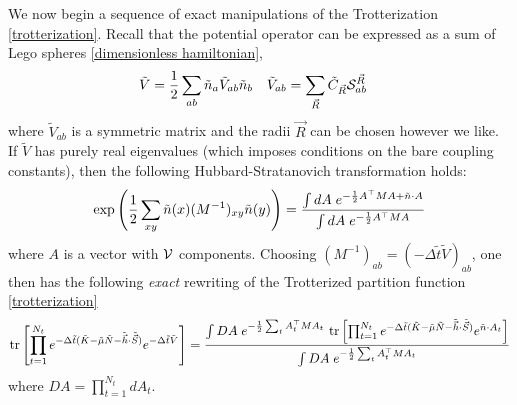 We now begin a sequence of exact manipulations of the Trotterization \eqref{trotterization}.
Recall that the potential operator can be expressed as a sum of Lego spheres \eqref{dimensionless hamiltonian},
\begin{align}
	\tilde{V}
	&= \frac{1}{2} \sum_{ab} \tilde{n}_a \tilde{V}_{ab} \tilde{n}_b
	&
	\tilde{V}_{ab}
	&=
	\sum_{\vec{R}} \tilde{C}_{\vec{R}} \mathcal{S}^{\vec{R}}_{ab}
\end{align}
where $\tilde{V}_{ab}$ is a symmetric matrix and the radii $\vec{R}$ can be chosen however we like.
If $\tilde{V}$ has purely real eigenvalues (which imposes conditions on the bare coupling constants), then the following Hubbard-Stratanovich transformation holds:
\begin{equation}
	\exp\left( \frac{1}{2} \sum_{x y}\tilde{n}(x) (M^{-1})_{xy} \tilde{n}(y) \right)
	=
	\frac{
		\int dA\; e^{-\frac{1}{2} A{}^{\top} M A + \tilde{n} \cdot {A} }
	}{
		\int dA\; e^{-\frac{1}{2} A{}^{\top} M A  }
	}
\end{equation}
where $A$ is a vector with $\mathcal{V}$ components.
Choosing $(M^{-1})_{ab} = (-\Delta \tilde{t} \tilde{V})_{ab}$, one then has the following \emph{exact} rewriting of the Trotterized partition function \eqref{trotterization}
\begin{equation}
	\text{tr}\left[\prod_{t=1}^{N_t} e^{-\Delta \tilde{t}(\tilde{K} - \tilde{\mu} \tilde{N} - \tilde{\vec{h}}\cdot\tilde{\vec{S}})}  e^{-\Delta \tilde{t}\tilde{V}} \right]
	= 
	\frac{  
		\int DA\; e^{-\frac{1}{2} \sum_t A{}^{\top}_t M A_t}
	~	\text{tr}\left[\prod_{t=1}^{N_t} e^{-\Delta \tilde{t}(\tilde{K} - \tilde{\mu} \tilde{N} - \tilde{\vec{h}}\cdot\tilde{\vec{S}})}  e^{ \tilde{n}\cdot A_t} \right] 
	}{ 
		\int DA\; e^{-\frac{1}{2} \sum_t A{}^{\top}_t M A_t}
	}
\end{equation}
where $DA = \prod_{t=1}^{N_t} d A_t $.

